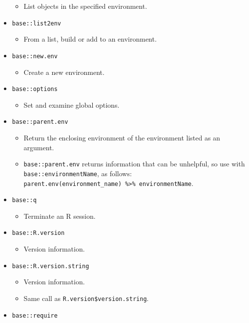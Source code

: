 \documentclass[
]{book}
\providecommand{\tightlist}{%
  \setlength{\itemsep}{0pt}\setlength{\parskip}{0pt}}
\begin{document}
\begin{itemize}
  \begin{itemize}
  \tightlist
  \item
    List objects in the specified environment.
  \end{itemize}
\item
  \texttt{base::list2env}

  \begin{itemize}
  \tightlist
  \item
    From a list, build or add to an environment.
  \end{itemize}
\item
  \texttt{base::new.env}

  \begin{itemize}
  \tightlist
  \item
    Create a new environment.
  \end{itemize}
\item
  \texttt{base::options}

  \begin{itemize}
  \tightlist
  \item
    Set and examine global options.
  \end{itemize}
\item
  \texttt{base::parent.env}

  \begin{itemize}
  \tightlist
  \item
    Return the enclosing environment of the environment listed as an argument.
  \item
    \texttt{base::parent.env} returns information that can be unhelpful, so use with \texttt{base::environmentName}, as follows: \texttt{parent.env(environment\_name)\ \%\textgreater{}\%\ environmentName}.
  \end{itemize}
\item
  \texttt{base::q}

  \begin{itemize}
  \tightlist
  \item
    Terminate an R session.
  \end{itemize}
\item
  \texttt{base::R.version}

  \begin{itemize}
  \tightlist
  \item
    Version information.
  \end{itemize}
\item
  \texttt{base::R.version.string}

  \begin{itemize}
  \tightlist
  \item
    Version information.
  \item
    Same call as \texttt{R.version\$version.string}.
  \end{itemize}
\item
  \texttt{base::require}


\end{itemize}
\end{document}

